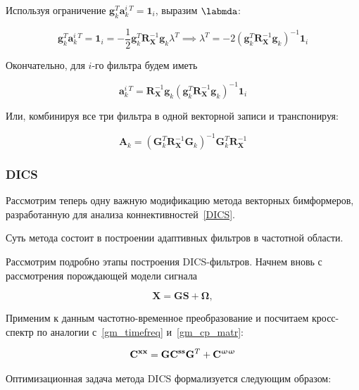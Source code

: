 Используя ограничение $\mathbf{g}_k^T \mathbf{a}_k^i^T = \mathbf{1}_i$, выразим $\labmda$:

\begin{equation}
    \mathbf{g}_k^T \mathbf{a}_k^i^T = \mathbf{1}_i =
    - \frac{1}{2}\mathbf{g}_k^T\mathbf{R}_\mathbf{X}^{-1} \mathbf{g}_k \lambda^T \implies
    \lambda^T = - 2(\mathbf{g}_k^T\mathbf{R}_\mathbf{X}^{-1} \mathbf{g}_k)^{-1} \mathbf{1}_i
\end{equation}

Окончательно, для $i$-го фильтра будем иметь

\begin{equation}
    \mathbf{a}_k^i^T = \mathbf{R}_\mathbf{X}^{-1} \mathbf{g}_k(\mathbf{g}_k^T\mathbf{R}_\mathbf{X}^{-1} \mathbf{g}_k)^{-1} \mathbf{1}_i
    \label{lcmv_filters_vec_comp}
\end{equation}

Или, комбинируя все три фильтра в одной векторной записи и транспонируя:

\begin{equation}
    \mathbf{A}_k =
    (\mathbf{G}_k^T\mathbf{R}_\mathbf{X}^{-1} \mathbf{G}_k)^{-1} \mathbf{G}_k^T \mathbf{R}_\mathbf{X}^{-1}
    \label{lcmv_filters_vec}
\end{equation}

\subsubsection{DICS}
Рассмотрим теперь одну важную модификацию метода векторных бимформеров,
разработанную для анализа коннективностей~\ref{DICS}.

Суть метода состоит в построении адаптивных фильтров в частотной области.

Рассмотрим подробно этапы построения DICS-фильтров.
Начнем вновь с рассмотрения порождающей модели сигнала

\begin{equation}
    \mathbf{X} = \mathbf{G} \mathbf{S} + \mathbf{\Omega},
    \label{gm_dics}
\end{equation}


Применим к данным частотно-временное преобразование и посчитаем кросс-спектр по аналогии
с~\ref{gm_timefreq} и~\ref{gm_cp_matr}:

\begin{gather}
    \mathbf{C}^{\mathbf{x x}} = \mathbf{G} \mathbf{C}^{\mathbf{s s}} \mathbf{G}^T + \mathbf{C}^{\mathbf{\upomega \upomega}}
    \label{gm_cp_matr}
\end{gather}


Оптимизационная задача метода DICS формализуется следующим образом:

